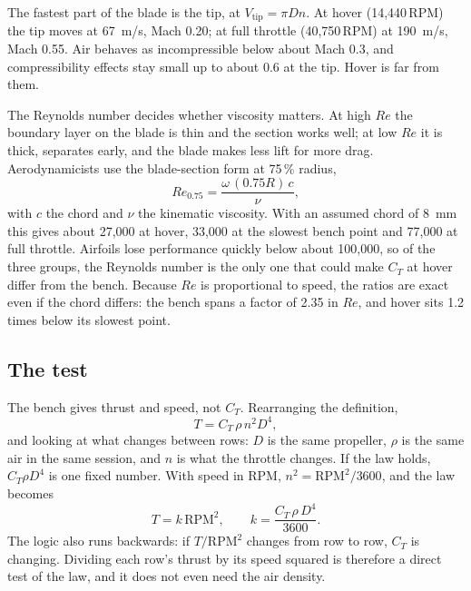 The fastest part of the blade is the tip, at $V_\text{tip} = \pi D n$. At hover (14,440\,RPM) the tip moves at \SI{67}{m/s}, Mach 0.20; at full throttle (40,750\,RPM) at \SI{190}{m/s}, Mach 0.55. Air behaves as incompressible below about Mach 0.3, and compressibility effects stay small up to about 0.6 at the tip. Hover is far from them.

The Reynolds number decides whether viscosity matters. At high $Re$ the boundary layer on the blade is thin and the section works well; at low $Re$ it is thick, separates early, and the blade makes less lift for more drag. Aerodynamicists use the blade-section form at 75\,\% radius,
\begin{equation}
Re_{0.75} = \frac{\omega\, (0.75R)\, c}{\nu},
\end{equation}
with $c$ the chord and $\nu$ the kinematic viscosity. With an assumed chord of \SI{8}{mm} this gives about 27,000 at hover, 33,000 at the slowest bench point and 77,000 at full throttle. Airfoils lose performance quickly below about 100,000, so of the three groups, the Reynolds number is the only one that could make $C_T$ at hover differ from the bench. Because $Re$ is proportional to speed, the ratios are exact even if the chord differs: the bench spans a factor of 2.35 in $Re$, and hover sits 1.2 times below its slowest point.

\subsection{The test}

The bench gives thrust and speed, not $C_T$. Rearranging the definition,
\begin{equation}
T = C_T\, \rho\, n^2 D^4,
\end{equation}
and looking at what changes between rows: $D$ is the same propeller, $\rho$ is the same air in the same session, and $n$ is what the throttle changes. If the law holds, $C_T \rho D^4$ is one fixed number. With speed in RPM, $n^2 = \text{RPM}^2/3600$, and the law becomes
\begin{equation}
T = k\, \text{RPM}^2, \qquad k = \frac{C_T\, \rho\, D^4}{3600}.
\end{equation}
The logic also runs backwards: if $T/\text{RPM}^2$ changes from row to row, $C_T$ is changing. Dividing each row's thrust by its speed squared is therefore a direct test of the law, and it does not even need the air density.

